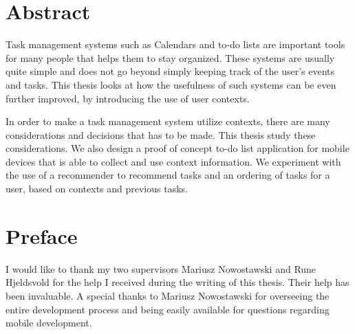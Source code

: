 \thesistitlepage %

\chapter*{Abstract}
Task management systems such as Calendars and to-do lists are important tools for many people that helps them to stay organized. These systems are usually quite simple and does not go beyond simply keeping track of the user's events and tasks. This thesis looks at how the usefulness of such systems can be even further improved, by introducing the use of user contexts.

In order to make a task management system utilize contexts, there are many considerations and decisions that has to be made. This thesis study these considerations. We also design a proof of concept to-do list application for mobile devices that is able to collect and use context information. We experiment with the use of a recommender to recommend tasks and an ordering of tasks for a user, based on contexts and previous tasks.



%

\chapter*{Preface}

I would like to thank my two supervisors Mariusz Nowostawski and Rune Hjeldsvold for the help I received during the writing of this thesis. Their help has been invaluable. A special thanks to Mariusz Nowostawski for overseeing the entire development process and being easily available for questions regarding mobile development.

